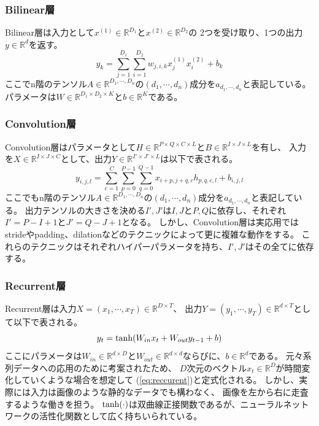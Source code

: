 \subsubsection{Bilinear層}
Bilinear層は入力として\(x^{(1)}\in \mathbb R^{D_1}\)と\(x^{(2)}\in \mathbb R^{D_2}\)の
2つを受け取り、1つの出力\(y \in \mathbb R^d\)を返す。
\begin{equation}
    y_k = \sum_{j=1}^{D_1}\sum_{i=1}^{D_2}w_{j,i,k}x_j^{(1)}x_i^{(2)} + b_k
\end{equation}
ここでn階のテンソル\(A\in \mathbb R^{D_1,\cdots ,D_n}\)の\((d_1,\cdots,d_n)\)成分を\(a_{d_1,\cdots,d_n}\)と表記している。
パラメータは\(W\in \mathbb R^{D_1\times D_2 \times K}\)と\(b \in \mathbb R^K\)である。

\subsubsection{Convolution層}
Convolution層はパラメータとして\(H \in \mathbb R^{P\times Q\times C\times L}\)と\(B \in \mathbb R^{I\times J\times L}\)を有し、
入力を\(X \in \mathbb R^{I\times J\times C}\)として、出力\(Y \in \mathbb R^{I'\times J'\times L}\)は以下で表される。
\begin{equation}
    y_{i,j,l} = \sum_{c=1}^C \sum_{p=0}^{P-1} \sum_{q=0}^{Q-1}x_{i+p,j+q,c}h_{p,q,c,l}+b_{i,j,l}
    \label{eq:convlayer}
\end{equation}
ここでもn階のテンソル\(A\in \mathbb R^{D_1,\cdots ,D_n}\)の\((d_1,\cdots,d_n)\)成分を\(a_{d_1,\cdots,d_n}\)と表記している。
出力テンソルの大きさを決める\(I',J'\)は\(I,J\)と\(P,Q\)に依存し、それぞれ\(I'=P-I+1\)と\(J'=Q-J+1\)となる。
しかし、Convolution層は実応用ではstrideやpadding、dilationなどのテクニックによって更に複雑な動作をする。
これらのテクニックはそれぞれハイパーパラメータを持ち、\(I',J'\)はその全てに依存する。

\subsubsection{Recurrent層}
Recurrent層は入力\(X = (x_1,\cdots,x_T)\in \mathbb R^{D \times T}\)、
出力\(Y = (y_1,\cdots,y_T)\in \mathbb R^{d \times T}\)として以下で表される。
\begin{equation}
    y_t = {\rm tanh}(W_{in}x_t + W_{out}y_{t-1} + b) 
    \label{eq:reccurent}
\end{equation}
ここにパラメータは\(W_{in} \in \mathbb R^{d \times D}\)と\(W_{out} \in \mathbb R^{d \times d}\)ならびに、\(b \in \mathbb R^d \)である。
元々系列データへの応用のために考案されたため、
\(D\)次元のベクトル\(x_t \in \mathbb R^D\)が時間変化していくような場合を想定して
(\ref{eq:reccurent})と定式化される。
しかし、実際には入力は画像のような静的なデータでも構わなく、
画像を左から右に走査するような働きを担う。
\(\rm tanh(\cdot)\)は双曲線正接関数であるが、ニューラルネットワークの活性化関数として広く持ちいられている。


